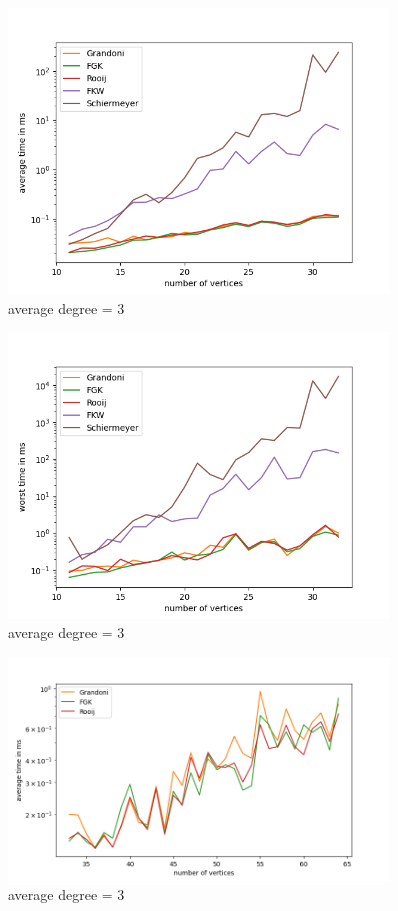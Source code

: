\begin{figure}[H]
    \centering
    \includegraphics[width=0.9\textwidth]{figures/m3_average.png}
    \caption{average degree = 3}
    \label{fig:m3_average}
\end{figure}

\begin{figure}[H]
    \centering
    \includegraphics[width=0.9\textwidth]{figures/m3_worst.png}
    \caption{average degree = 3}
    \label{fig:m3_worst}
\end{figure}

\begin{figure}[H]
    \centering
    \includegraphics[width=0.9\textwidth]{figures/l3_average.png}
    \caption{average degree = 3}
    \label{fig:l3_average}
\end{figure}

